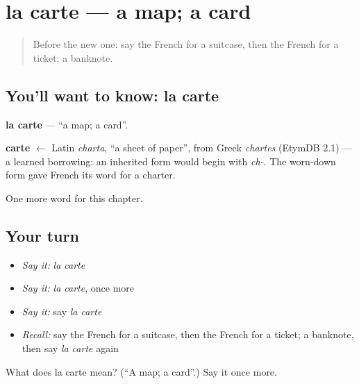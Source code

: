\section[la carte]{la carte — a map; a card}

\label{lesson:FR-C80-carte}



\begin{quote}
Before the new one: say the French for a suitcase, then the French for a ticket; a banknote.
\end{quote}

\subsection*{You'll want to know: la carte}
\textbf{la carte} — \textquotedblleft{}a map; a card\textquotedblright{}.

\begin{cousinweb}
\textbf{carte} $\leftarrow$ Latin \emph{charta}, \textquotedblleft{}a sheet of paper\textquotedblright{}, from Greek \emph{chartes} (EtymDB 2.1) — a learned borrowing: an inherited form would begin with \emph{ch-}. The worn-down form gave French its word for a charter.
\end{cousinweb}

\begin{grammarlens}[title={What you've built}]
One more word for this chapter.
\end{grammarlens}

\subsection*{Your turn}
\begin{itemize}
\raggedright
  \item \emph{Say it:} \emph{la carte}
  \item \emph{Say it:} \emph{la carte}, once more
  \item \emph{Say it:} say \emph{la carte}
  \item \emph{Recall:} say the French for a suitcase, then the French for a ticket; a banknote, then say \emph{la carte} again
\end{itemize}

\begin{tcolorbox}[breakable,colback=teal!4,colframe=teal!35!black,title={Before you move on}]
What does la carte mean? (\textquotedblleft{}A map; a card\textquotedblright{}.) Say it once more.
\end{tcolorbox}
